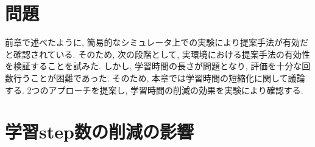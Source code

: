 
\section{問題}
前章で述べたように, 簡易的なシミュレータ上での実験により提案手法が有効だと確認されている. そのため, 次の段階として, 実環境における提案手法の有効性を検証することを試みた. しかし, 学習時間の長さが問題となり, 評価を十分な回数行うことが困難であった. そのため, 本章では学習時間の短縮化に関して議論する. 2つのアプローチを提案し, 学習時間の削減の効果を実験により確認する.



\newpage
\section{学習step数の削減の影響}




